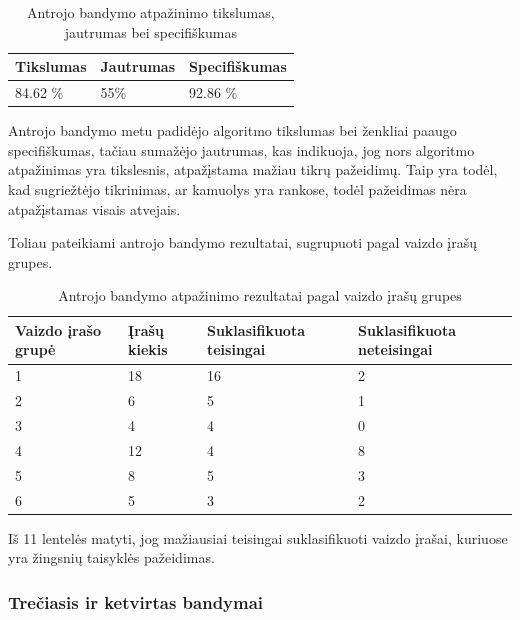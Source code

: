 \documentclass{VUMIFPSbakalaurinis}
\begin{document}
\begin{table}[H]\footnotesize
	\centering
	\caption{Antrojo bandymo atpažinimo tikslumas, jautrumas bei specifiškumas}
	{\begin{tabular}{|p{5cm}|p{5cm}|p{5cm}|} \hline
			\textbf{Tikslumas} & \textbf{Jautrumas} & \textbf{Specifiškumas} \\
			\hline
			84.62 \%  & 55\%    & 92.86 \%    \\
			
			\hline
	\end{tabular}}
	\label{tab:second_trial_percents}
\end{table}

Antrojo bandymo metu padidėjo algoritmo tikslumas bei ženkliai paaugo specifiškumas, tačiau sumažėjo jautrumas, kas indikuoja, jog nors algoritmo atpažinimas yra tikslesnis, atpažįstama mažiau tikrų pažeidimų. Taip yra todėl, kad sugriežtėjo tikrinimas, ar kamuolys yra rankose, todėl pažeidimas nėra atpažįstamas visais atvejais. 

Toliau pateikiami antrojo bandymo rezultatai, sugrupuoti pagal vaizdo įrašų grupes.

\begin{table}[H]\footnotesize
	\centering
	\caption{Antrojo bandymo atpažinimo rezultatai pagal vaizdo įrašų grupes}
	{\begin{tabular}{|p{3cm}|p{3cm}|p{3cm}|p{3cm}|} \hline
			\textbf{Vaizdo įrašo grupė} & \textbf{Įrašų kiekis} & \textbf{Suklasifikuota teisingai} & \textbf{Suklasifikuota neteisingai} \\
			\hline
			1  & 18    & 16    & 2    \\
			\hline
			2  & 6    & 5  & 1     \\
			\hline
			3  & 4    & 4   & 0    \\
			\hline
			4  & 12    & 4  & 8     \\
			\hline
			5  & 8    & 5  & 3     \\
			\hline
			6  & 5    & 3  & 2     \\
			\hline
	\end{tabular}}
	\label{tab:recognizion_results_grouped}
\end{table}

Iš 11 lentelės matyti, jog mažiausiai teisingai suklasifikuoti vaizdo įrašai, kuriuose yra žingsnių taisyklės pažeidimas.  

\subsubsection{Trečiasis ir ketvirtas bandymai}
\end{document}
